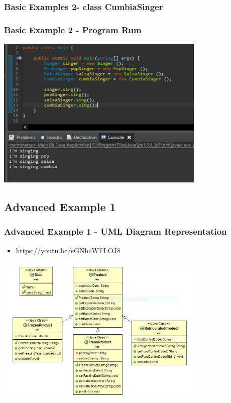 \documentclass[11pt]{beamer}
\begin{document}
\begin{frame}
\frametitle{Basic Examples 2- class CumbiaSinger}

\end{frame}

\begin{frame}
\frametitle{Basic Example 2 - Program Rum}
\begin{center}
{\includegraphics[width=10.0cm]{img/RunBasic1.png}}
\end{center}
\end{frame}



\begin{frame}
\section{Advanced Example 1}
\frametitle{Advanced Example 1 - UML Diagram Representation}
\begin{itemize}
\item \url{https://youtu.be/sGNhcWFLOJ8}
\end{itemize}
\begin{center}
{\includegraphics[width=10.0cm]{img/UmlAdvanced1.jpeg}}
\end{center}
\end{frame}
\end{document}
